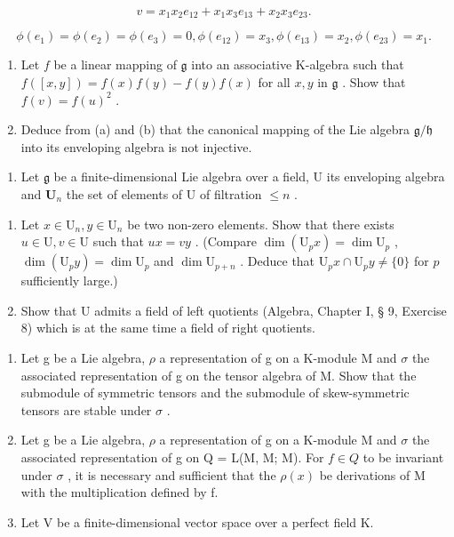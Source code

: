 \[
v = x _ {1} x _ {2} e _ {1 2} + x _ {1} x _ {3} e _ {1 3} + x _ {2} x _ {3} e _ {2 3}.
\]

\[
\phi \left(e _ {1}\right) = \phi \left(e _ {2}\right) = \phi \left(e _ {3}\right) = 0, \phi \left(e _ {1 2}\right) = x _ {3}, \phi \left(e _ {1 3}\right) = x _ {2}, \phi \left(e _ {2 3}\right) = x _ {1}.
\]

\begin{enumerate}
\def\labelenumi{(\alph{enumi})}
\setcounter{enumi}{1}
\item
  Let \(f\) be a linear mapping of \(\mathfrak{g}\) into an associative K-algebra such that \(f([x,y]) = f(x)f(y) - f(y)f(x)\) for all \(x, y\) in \(\mathfrak{g}\) . Show that \(f(v) = f(u)^2\) .
\item
  Deduce from (a) and (b) that the canonical mapping of the Lie algebra \(\mathfrak{g} / \mathfrak{h}\) into its enveloping algebra is not injective.
\end{enumerate}

\begin{enumerate}
\def\labelenumi{\arabic{enumi}.}
\setcounter{enumi}{9}
\tightlist
\item
  Let \(\mathfrak{g}\) be a finite-dimensional Lie algebra over a field, U its enveloping algebra and \(\mathbf{U}_n\) the set of elements of U of filtration \(\leqslant n\) .
\end{enumerate}

\begin{enumerate}
\def\labelenumi{(\alph{enumi})}
\item
  Let \(x \in \mathrm{U}_n, y \in \mathrm{U}_n\) be two non-zero elements. Show that there exists \(u \in \mathrm{U}, v \in \mathrm{U}\) such that \(ux = vy\) . (Compare \(\dim(\mathrm{U}_p x) = \dim \mathrm{U}_p\) , \(\dim(\mathrm{U}_p y) = \dim \mathrm{U}_p\) and \(\dim \mathrm{U}_{p+n}\) . Deduce that \(\mathrm{U}_p x \cap \mathrm{U}_p y \neq \{0\}\) for \(p\) sufficiently large.)
\item
  Show that U admits a field of left quotients (Algebra, Chapter I, § 9, Exercise 8) which is at the same time a field of right quotients.
\end{enumerate}


\begin{enumerate}
\def\labelenumi{\arabic{enumi}.}
\item
  Let g be a Lie algebra, \(\rho\) a representation of g on a K-module M and \(\sigma\) the associated representation of g on the tensor algebra of M. Show that the submodule of symmetric tensors and the submodule of skew-symmetric tensors are stable under \(\sigma\) .
\item
  Let g be a Lie algebra, \(\rho\) a representation of g on a K-module M and \(\sigma\) the associated representation of g on Q = L(M, M; M). For \(f \in Q\) to be invariant under \(\sigma\) , it is necessary and sufficient that the \(\rho(x)\) be derivations of M with the multiplication defined by f.
\item
  Let V be a finite-dimensional vector space over a perfect field K.
\end{enumerate}

